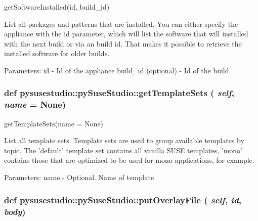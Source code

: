 \label{classpysusestudio_1_1py_suse_studio_a9ee9e20b9c942e502c1d45552d118c18}
\begin{DoxyVerb}getSoftwareInstalled(id, build_id)

        List all packages and patterns that are installed. You can either specify the 
        appliance with the id parameter, which will list the software 
        that will installed with the next build or via an build id. That makes it possible 
        to retrieve the installed software for older builds.   
            
            Parameters:
id - Id of the appliance
build_id (optional) - Id of the build.

\end{DoxyVerb}
 \hypertarget{classpysusestudio_1_1py_suse_studio_acfcc75e5a423bc1579431ed9e0e56997}{
\subsubsection[{getTemplateSets}]{\setlength{\rightskip}{0pt plus 5cm}def pysusestudio::pySuseStudio::getTemplateSets ( {\em self}, \/   {\em name} = {\ttfamily None})}}
\label{classpysusestudio_1_1py_suse_studio_acfcc75e5a423bc1579431ed9e0e56997}
\begin{DoxyVerb}getTemplateSets(name = None)

        List all template sets.
            Template sets are used to group available templates by topic. The 'default'
            template set contains all vanilla SUSE templates, 'mono' contains those that
            are optimized to be used for mono applications, for example. 
            
            Parameters:
name - Optional. Name of template

\end{DoxyVerb}
 \hypertarget{classpysusestudio_1_1py_suse_studio_aabf405f8c1c7b56b71a2d4911a3df813}{
\subsubsection[{putOverlayFile}]{\setlength{\rightskip}{0pt plus 5cm}def pysusestudio::pySuseStudio::putOverlayFile ( {\em self}, \/   {\em id}, \/   {\em body})}}
